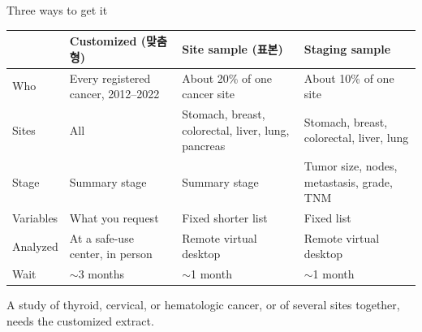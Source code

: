 \documentclass[aspectratio=169,11pt]{beamer}
\newcommand{\han}[1]{{\footnotesize\color{kdgray}(#1)}}
\begin{document}
\begin{frame}{Three ways to get it}
  \vspace{-2pt}
  \renewcommand{\arraystretch}{1.25}
  {\footnotesize
  \begin{tabularx}{\textwidth}{@{}l >{\raggedright\arraybackslash}X >{\raggedright\arraybackslash}X >{\raggedright\arraybackslash}X@{}}
    \toprule
    & \textbf{Customized} \han{맞춤형} & \textbf{Site sample} \han{표본} & \textbf{Staging sample} \\
    \midrule
    Who & Every registered cancer, 2012--2022 & About 20\% of one cancer site & About 10\% of one site \\
    Sites & All & Stomach, breast, colorectal, liver, lung, pancreas & Stomach, breast, colorectal, liver, lung \\
    Stage & Summary stage & Summary stage & Tumor size, nodes, metastasis, grade, TNM \\
    Variables & What you request & Fixed shorter list & Fixed list \\
    Analyzed & At a safe-use center, in person & Remote virtual desktop & Remote virtual desktop \\
    Wait & $\sim$3 months & $\sim$1 month & $\sim$1 month \\
    \bottomrule
  \end{tabularx}}
  \vspace{6pt}

  {\small A study of thyroid, cervical, or hematologic cancer, or of several sites
  together, needs the customized extract.}
\end{frame}
\end{document}
